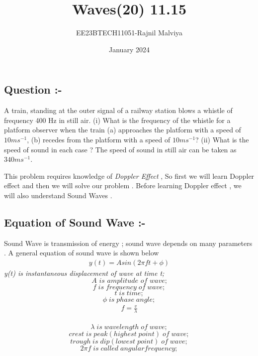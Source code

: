 \documentclass[journal,12pt,twocolumn]{IEEEtran}
\theoremstyle{remark}
\begin{document}
\title{Waves(20) 11.15}
\author{EE23BTECH11051-Rajnil Malviya}
\date{January 2024}



\maketitle

\subsection*{\textbf{Question :-}}
A train, standing at the outer signal of a railway station blows a whistle of frequency
400 Hz in still air. (i) What is the frequency of the whistle for a platform observer
when the train (a) approaches the platform with a speed of $10 ms^{-1} $, (b) recedes
from the platform with a speed of $10 ms^{-1} $? (ii) What is the speed of sound in each
case ? The speed of sound in still air can be taken as $340 ms^{-1} $.

\bigskip
 This problem requires knowledge of \textit{Doppler Effect} , So first we will learn Doppler effect and then we will solve our problem . Before learning Doppler effect , we will also understand Sound Waves .

\subsection*{\textbf{Equation of Sound Wave :-}}
Sound Wave is transmission of energy ; sound wave depends on many parameters . A general equation of sound wave is shown below 
\begin{align}y(t) = Asin( 2 \pi ft + \phi ) \end{align} 
\textit{y(t) is instantaneous 
displacement of wave at time t;}$$\textit{A is amplitude of wave;}$$$$f\;is\; frequency\; of\; wave;$$
$$t \;is\; time;$$$$\phi \; is \; phase \; angle;$$
\begin{align}f = \frac{v}{\lambda}\end{align}\\
$$\lambda \;is\; wavelength\; of\; wave;$$$$crest \;is\; peak(highest\; point) \;of\; wave;$$$$trough\; is\; dip(lowest\; point) \;of\; wave;$$
$$2\pi f \;is \; called\; angular frequency;$$
\end{document}

